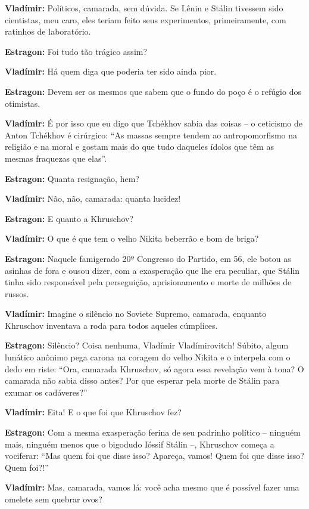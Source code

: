 \textbf{Vladímir:} Políticos, camarada, sem dúvida. Se Lênin e Stálin
tivessem sido cientistas, meu caro, eles teriam feito seus experimentos,
primeiramente, com ratinhos de laboratório.

\textbf{Estragon:} Foi tudo tão trágico assim?

\textbf{Vladímir:} Há quem diga que poderia ter sido ainda pior.

\textbf{Estragon:} Devem ser os mesmos que sabem que o fundo do poço é o
refúgio dos otimistas.

\textbf{Vladímir:} É por isso que eu digo que Tchékhov sabia das coisas
-- o ceticismo de Anton Tchékhov é cirúrgico: ``As massas sempre tendem
ao antropomorfismo na religião e na moral e gostam mais do que tudo
daqueles ídolos que têm as mesmas fraquezas que elas''.

\textbf{Estragon:} Quanta resignação, hem?

\textbf{Vladímir:} Não, não, camarada: quanta lucidez!

\textbf{Estragon:} E quanto a Khruschov?

\textbf{Vladímir:} O que é que tem o velho Nikita beberrão e bom de
briga?

\textbf{Estragon:} Naquele famigerado 20º Congresso do Partido, em 56,
ele botou as asinhas de fora e ousou dizer, com a exasperação que lhe
era peculiar, que Stálin tinha sido responsável pela perseguição,
aprisionamento e morte de milhões de russos.

\textbf{Vladímir:} Imagine o silêncio no Soviete Supremo, camarada,
enquanto Khruschov inventava a roda para todos aqueles cúmplices.

\textbf{Estragon:} Silêncio? Coisa nenhuma, Vladímir Vladímirovitch!
Súbito, algum lunático anônimo pega carona na coragem do velho Nikita e
o interpela com o dedo em riste: ``Ora, camarada Khruschov, só agora
essa revelação vem à tona? O camarada não sabia disso antes? Por que
esperar pela morte de Stálin para exumar os cadáveres?''

\textbf{Vladímir:} Eita! E o que foi que Khruschov fez?

\textbf{Estragon:} Com a mesma exasperação ferina de seu padrinho
político -- ninguém mais, ninguém menos que o bigodudo Ióssif Stálin --,
Khruschov começa a vociferar: ``Mas quem foi que disse isso? Apareça,
vamos! Quem foi que disse isso? Quem foi?!''

\textbf{Vladímir:} Mas, camarada, vamos lá: você acha mesmo que é
possível fazer uma omelete sem quebrar ovos?

